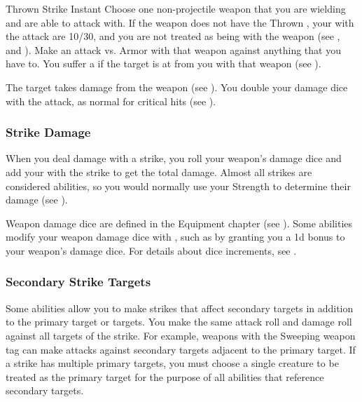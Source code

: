         \begin{instantability}{Thrown Strike}
            \label{Thrown Strike}
            Instant
            \rankline
            Choose one non-projectile weapon that you are wielding and are able to attack with.
            If the weapon does not have the Thrown , your  with the attack are 10/30, and you are not treated as being  with the weapon (see , and ).
            Make an attack vs. Armor with that weapon against anything that you have  to.
            You suffer a  if the target is at  from you with that weapon (see ).

            \hit The target takes damage from the weapon (see ).
            \crit You double your damage dice with the attack, as normal for critical hits (see ).
        \end{instantability}

        \subsubsection{Strike Damage}\label{Strike Damage}
            When you deal damage with a strike, you roll your weapon's damage dice and add your  with the strike to get the total damage.
            Almost all strikes are considered  abilities, so you would normally use your Strength to determine their damage (see ).

            Weapon damage dice are defined in the Equipment chapter (see ).
            Some abilities modify your weapon damage dice with , such as by granting you a \plus1d bonus to your weapon's damage dice.
            For details about dice increments, see .

        \subsubsection{Secondary Strike Targets}\label{Secondary Strike Targets}
            Some abilities allow you to make strikes that affect secondary targets in addition to the primary target or targets.
            You make the same attack roll and damage roll against all targets of the strike.
            For example, weapons with the Sweeping weapon tag can make attacks against secondary targets adjacent to the primary target.
            If a strike has multiple primary targets, you must choose a single creature to be treated as the primary target for the purpose of all abilities that reference secondary targets.

